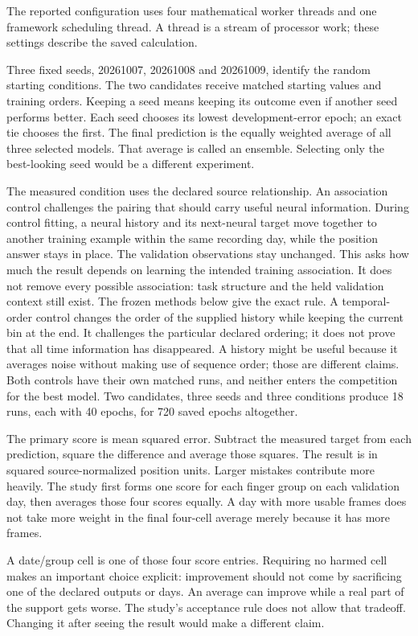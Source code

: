 The reported configuration uses four mathematical worker threads and one
framework scheduling thread. A thread is a stream of processor work; these
settings describe the saved calculation.

Three fixed seeds, 20261007, 20261008 and 20261009, identify the random starting
conditions. The two candidates receive matched starting values and training
orders. Keeping a seed means keeping its outcome even if another seed performs
better. Each seed chooses its lowest development-error epoch; an exact tie
chooses the first. The final prediction is the equally weighted average of
all three selected models. That average is called an ensemble. Selecting only
the best-looking seed would be a different experiment.

The measured condition uses the declared source relationship. An association
control challenges the pairing that should carry useful neural information.
During control fitting, a neural history and its next-neural target move together
to another training example within the same recording day, while the position
answer stays in place. The validation observations stay unchanged. This asks
how much the result depends on learning the intended training association.
It does not remove every possible association: task structure and the held
validation context still exist. The frozen methods below give the exact rule.
A temporal-order control changes the order of the supplied history while keeping
the current bin at the end. It challenges the particular declared ordering;
it does not prove that all time information has disappeared. A history might
be useful because it averages noise without making use of sequence order;
those are different claims. Both controls have their own matched
runs, and neither enters the competition for the best model. Two candidates,
three seeds and three conditions produce 18 runs, each with 40 epochs, for 720
saved epochs altogether.

The primary score is mean squared error. Subtract the measured target from each
prediction, square the difference and average those squares. The result is in
squared source-normalized position units. Larger mistakes contribute more heavily. The study first forms
one score for each finger group on each validation day, then averages those
four scores equally. A day with more usable frames does not take more weight
in the final four-cell average merely because it has more frames.

A date/group cell is one of those four score entries. Requiring no harmed cell
makes an important choice explicit: improvement should not come by sacrificing
one of the declared outputs or days. An average can improve while a real part
of the support gets worse. The study's acceptance rule does not allow that
tradeoff. Changing it after seeing the result would make a different claim.

